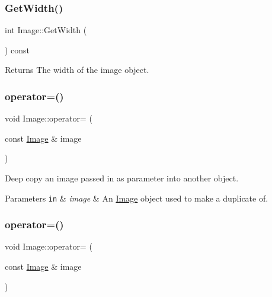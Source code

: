 \subsubsection{\texorpdfstring{Get\+Width()}{GetWidth()}\hspace{0.1cm}{\footnotesize\ttfamily [2/2]}}
{\footnotesize\ttfamily int Image\+::\+Get\+Width (\begin{DoxyParamCaption}{ }\end{DoxyParamCaption}) const}

\begin{DoxyReturn}{Returns}
The width of the image object. 
\end{DoxyReturn}
\mbox{\label{classImage_ae6b1cdd82584ce9fb729c1e062ee088b}} 
\subsubsection{\texorpdfstring{operator=()}{operator=()}\hspace{0.1cm}{\footnotesize\ttfamily [1/2]}}
{\footnotesize\ttfamily void Image\+::operator= (\begin{DoxyParamCaption}\item[{const \hyperlink{classImage}{Image} \&}]{image }\end{DoxyParamCaption})}



Deep copy an image passed in as parameter into another object. 


\begin{DoxyParams}[1]{Parameters}
\mbox{\tt in}  & {\em image} & An \hyperlink{classImage}{Image} object used to make a duplicate of. \\
\hline
\end{DoxyParams}
\mbox{\label{classImage_ae6b1cdd82584ce9fb729c1e062ee088b}} 
\subsubsection{\texorpdfstring{operator=()}{operator=()}\hspace{0.1cm}{\footnotesize\ttfamily [2/2]}}
{\footnotesize\ttfamily void Image\+::operator= (\begin{DoxyParamCaption}\item[{const \hyperlink{classImage}{Image} \&}]{image }\end{DoxyParamCaption})}



